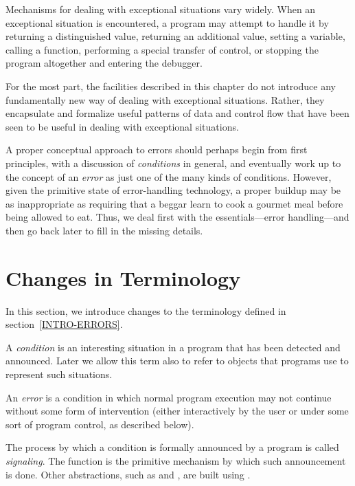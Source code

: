 Mechanisms for dealing with exceptional situations vary widely. When an
exceptional situation is encountered, a program may attempt to handle
it by returning a distinguished value, returning an additional value,
setting a variable, calling a function, performing a special transfer of
control, or stopping the program altogether and entering the debugger.

For the most part, the facilities described in this chapter do not introduce
any fundamentally new way of dealing with exceptional situations. Rather, they
encapsulate and formalize useful patterns of data and control flow that have
been seen to be useful in dealing with exceptional situations.

A proper conceptual approach to errors should perhaps begin from first
principles, with a discussion of \emph{conditions} in general, and eventually work
up to the concept of an \emph{error} as just one of the many kinds of
conditions. However, given the primitive state of error-handling
technology, a proper buildup may be as inappropriate as requiring that a
beggar learn to cook a gourmet meal before being allowed to eat.  Thus,
we deal first with the essentials---error handling---and then
go back later to fill in the missing details.

\section{Changes in Terminology}

In this section, we introduce changes to the terminology
defined in section~\ref{INTRO-ERRORS}.

A \emph{condition} is an interesting situation in a program that has been
detected and announced. Later we allow this term also to refer to
objects that programs use to represent such situations.

An \emph{error} is a condition in which normal program execution may not
continue without some form of intervention (either interactively by the user
or under some sort of program control, as described below).

The process by which a condition is formally announced by a program is called
\emph{signaling}. The function  is the primitive mechanism by which such
announcement is done. Other abstractions, such as  and , are built
using .

